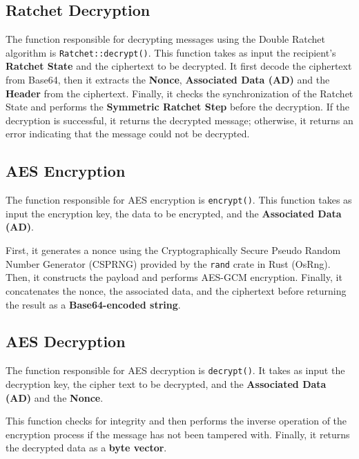 \subsection{Ratchet Decryption}
\label{subsec:RatchetDecryption}
The function responsible for decrypting messages using the Double Ratchet algorithm is \texttt{Ratchet::decrypt()}. This function takes as input the recipient's \textbf{Ratchet State} and the ciphertext to be decrypted.
It first decode the ciphertext from Base64, then it extracts the \textbf{Nonce}, \textbf{Associated Data (AD)} and the \textbf{Header} from the ciphertext. Finally, it checks the synchronization of the Ratchet State and performs the \textbf{Symmetric Ratchet Step} before the decryption. If the decryption is successful, it returns the decrypted message; otherwise, it returns an error indicating that the message could not be decrypted.



\subsection{AES Encryption}
\label{subsec:AESEncryption}

The function responsible for AES encryption is \texttt{encrypt()}. This function takes as input the encryption key, the data to be encrypted, and the \textbf{Associated Data (AD)}.

First, it generates a nonce using the Cryptographically Secure Pseudo Random Number Generator (CSPRNG) provided by the \texttt{rand} crate in Rust (OsRng). Then, it constructs the payload and performs AES-GCM encryption. Finally, it concatenates the nonce, the associated data, and the ciphertext before returning the result as a \textbf{Base64-encoded string}.

\subsection{AES Decryption}
\label{subsec:AESDecryption}

The function responsible for AES decryption is \texttt{decrypt()}. It takes as input the decryption key, the cipher text to be decrypted, and the \textbf{Associated Data (AD)} and the \textbf{Nonce}.

This function checks for integrity and then performs the inverse operation of the encryption process if the message has not been tampered with. Finally, it returns the decrypted data as a \textbf{byte vector}.


